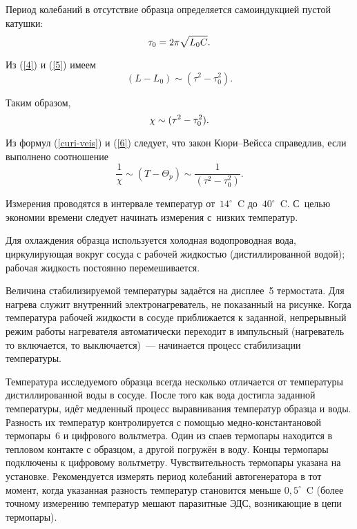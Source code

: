 Период колебаний в отсутствие образца определяется самоиндукцией пустой катушки:
\begin{equation}%
	\tau_0=2\pi\sqrt{L_0 C}.
	\eqmark{5}
\end{equation}

Из (\eqref{4}) и (\eqref{5}) имеем
\begin{equation*}
	(L-L_0)\sim (\tau^2-\tau_0^2).
\end{equation*}

Таким образом,
\begin{equation}%
	\eqmark{6}
	\chi\sim (\tau^2-\tau_0^2).
\end{equation}

Из формул (\eqref{curi-veis}) и (\eqref{6}) следует, что закон Кюри--Вейсса справедлив, если выполнено соотношение
\begin{equation}
	\frac{1}{\chi}\sim(T-\Theta_p)\sim\frac{1}{(\tau^2-\tau_0^2)}.
\end{equation}

Измерения проводятся в интервале температур от~$14^\circ$~C до~$40^\circ$~C. С~целью экономии времени следует начинать измерения
с~низких температур.

Для охлаждения образца используется холодная водопроводная вода, циркулирующая вокруг сосуда с рабочей жидкостью
(дистиллированной водой); рабочая жидкость постоянно перемешивается.

Величина стабилизируемой температуры задаётся на дисплее~5 термостата. Для нагрева служит внутренний электронагреватель,
не показанный на рисунке. Когда температура рабочей жидкости в сосуде приближается к заданной, непрерывный режим работы
нагревателя автоматически переходит в импульсный (нагреватель то включается, то выключается)~--- начинается процесс
стабилизации температуры.

Температура исследуемого образца всегда несколько отличается от температуры дистиллированной воды в сосуде. После того
как вода достигла заданной температуры, идёт медленный процесс выравнивания температур образца и воды. Разность их
температур контролируется с помощью медно-константановой термопары~6 и цифрового вольтметра. Один из спаев термопары
находится в тепловом контакте с образцом, а другой погружён в воду. Концы термопары подключены к цифровому вольтметру.
Чувствительность термопары указана на установке. Рекомендуется измерять период колебаний автогенератора в тот момент,
когда указанная разность температур становится меньше $0,5^\circ$~C (более точному измерению температур мешают паразитные ЭДС,
возникающие в цепи термопары).

